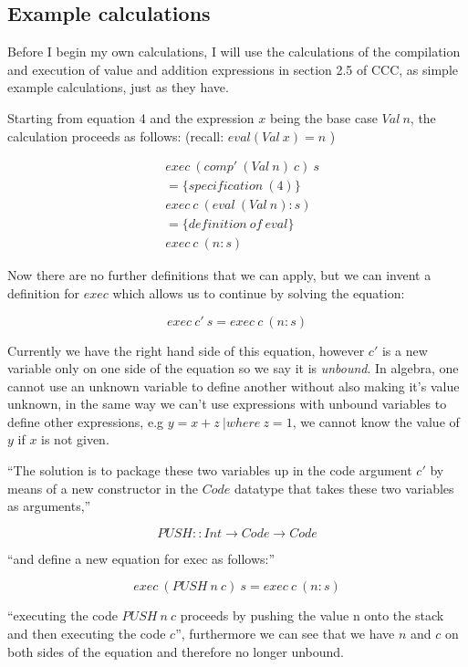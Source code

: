 \documentclass {article}
\begin{document}
\subsection{Example calculations}

Before I begin my own calculations,
I will use the
calculations of the compilation and execution
of value and addition expressions in
section 2.5 of CCC, as simple example
calculations, just as they have.

Starting from equation 4 and the expression $x$
being the base case $Val  \ n$, 
the calculation proceeds as follows\cite{bandh}:
(recall: \( eval (Val \  x) = n  \) )

\begin{align*}
	&exec \ (comp' \ (Val \ n) \ c) \ s \\
	&= \{specification \ (4) \} \\
	&exec \ c \ (eval \ (Val \ n) : s) \\
	&= \{definition \ of \ eval\} \\
	&exec \ c \ (n:s)
\end{align*}

Now there are no further definitions that we can apply,
but we can invent a definition for $exec$ which allows
us to continue by solving the equation:

\[ exec \ c' \ s = exec \ c \ (n : s) \]

Currently we have the right hand side of this equation,
however $c'$ is a new variable only on one side of the equation
so we say it is \emph{unbound}.
In algebra, one cannot use an unknown variable to define
another without also making it's value unknown,
in the same way we can't use expressions with
unbound variables to define other expressions,
e.g \(y = x + z \ | where \ z = 1\), we cannot
know the value of $y$ if $x$ is not given.

``The solution is to package these two
variables up in the code argument $c'$
by means of a new constructor in the $Code$ datatype
that takes these two variables as arguments,''

\[ PUSH :: Int \rightarrow Code \rightarrow Code \]

``and define a new equation for exec as follows:''

\[ exec \ (PUSH \ n \ c) \ s = exec \ c \ (n :s) \]

``executing the code $PUSH \ n \ c$ 
proceeds by pushing the value n onto the stack and
then executing the code $c$'', furthermore
we can see that we have $n$ and $c$ on both
sides of the equation and therefore no longer unbound.
\end{document}
